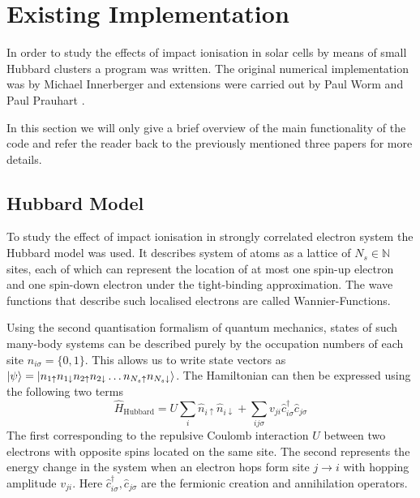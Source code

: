 \section{Existing Implementation}
In order to study the effects of impact ionisation in solar cells by means of small Hubbard clusters a program was written. The original numerical implementation was by Michael Innerberger \cite{innerberger} and extensions were carried out by Paul Worm \cite{worm_bachelor, worm_project} and Paul Prauhart \cite{prauhart}.
\medskip

In this section we will only give a brief overview of the main functionality of the code and refer the reader back to the previously mentioned three papers for more details.

\subsection{Hubbard Model}
To study the effect of impact ionisation in strongly correlated electron system the Hubbard model was used. It describes system of atoms as a lattice of $N_s\in \mathbb{N}$ sites, each of which can represent the location of at most one spin-up electron and one spin-down electron under the tight-binding approximation. The wave functions that describe such localised electrons are called Wannier-Functions.
\medskip

Using the second quantisation formalism of quantum mechanics, states of such many-body systems can be described purely by the occupation numbers of each site $n_{i\sigma} = \{0,1\}$. This allows us to write state vectors as $\ket{\psi}= \ket{n_{1\uparrow}n_{1\downarrow} n_{2\uparrow}n_{2\downarrow}\dots n_{N_{s}\uparrow}n_{N_{s}\downarrow}}$. The Hamiltonian can then be expressed using the following two terms
\begin{equation}
    \hat{H}_{\text{Hubbard}} = U \sum_i \hat{n}_{i\uparrow} \hat{n}_{i\downarrow} + \sum_{ij\sigma} v_{ji} \hat{c}^\dagger_{i\sigma} \hat{c}_{j\sigma}\label{eq:hubbard_hamiltonian}
\end{equation}
The first corresponding to the repulsive Coulomb interaction $U$ between two electrons with opposite spins located on the same site. The second represents the energy change in the system when an electron hops form site $j\to i$ with hopping amplitude $v_{ji}$. Here $\hat{c}_{i\sigma}^\dagger, \hat{c}_{j\sigma}$ are the fermionic creation and annihilation operators.

